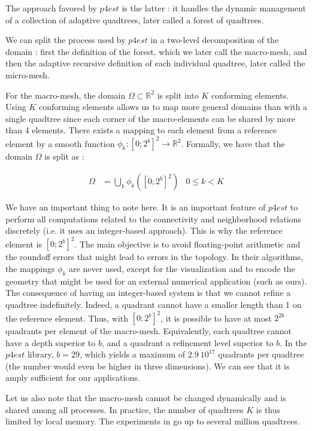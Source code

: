 The approach favored by $p4est$ is the latter : it handles the dynamic management of a collection of adaptive quadtrees, later called a forest of quadtrees. 

We can split the process used by $p4est$ in a two-level decomposition of the domain : first the definition of the forest, which we later call the macro-mesh, and then the adaptive recursive definition of each individual quadtree, later called the micro-mesh.

For the macro-mesh, the domain $\Omega \subset \mathbb{R}^2$ is split into $K$ conforming elements. Using $K$ conforming elements allows us to map more general domains than with a single quadtree since each corner of the macro-elements can be shared by more than 4 elements. There exists a mapping to each element from a reference element by a smooth function $\phi_k : [0;2^b]^2 \rightarrow \mathbb{R}^2$. Formally, we have that the domain $\Omega$ is split as : 

\begin{align*}
\Omega &= \bigcup_k \phi_k([0;2^b]^2) &0\leq k < K
\end{align*} 

We have an important thing to note here. It is an important feature of $p4est$ to perform all computations related to the connectivity and neighborhood relations discretely (i.e. it uses an integer-based approach). This is why the reference element is $[0;2^b]^2$. The main objective is to avoid floating-point arithmetic and the roundoff errors that might lead to errors in the topology. In their algorithms, the mappings $\phi_k$ are never used, except for the visualization and to encode the geometry that might be used for an external numerical application (such as ours). The consequence of having an integer-based system is that we cannot refine a quadtree indefinitely. Indeed, a quadrant cannot have a smaller length than 1 on the reference element. Thus, with $[0;2^b]^2$, it is possible to have at most $2^{2b}$ quadrants per element of the macro-mesh. Equivalently, each quadtree cannot have a depth superior to $b$, and a quadrant a refinement level superior to $b$. In the $p4est$ library, $b=29$, which yields a maximum of $2.9 \: 10^{17}$ quadrants per quadtree (the number would even be higher in three dimensions). We can see that it is amply sufficient for our applications. 

Let us also note that the macro-mesh cannot be changed dynamically and is shared among all processes. In practice, the number of quadtrees $K$ is thus limited by local memory. The experiments in \cite{p4est} go up to several million quadtrees.

